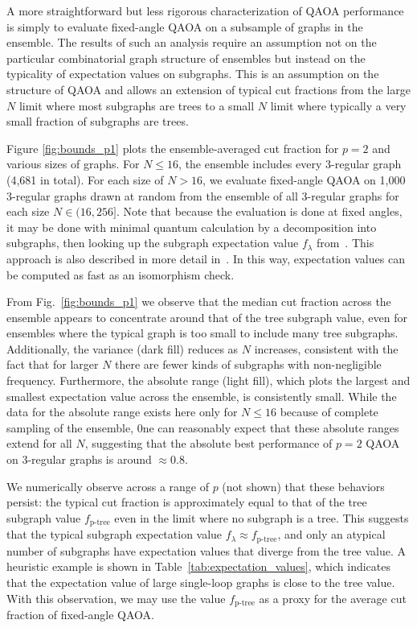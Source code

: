 \documentclass[prb,reprint,nofootinbib,longbibliography,superscriptaddress]{revtex4-1}
\begin{document}
A more straightforward but less rigorous characterization of QAOA performance is simply to evaluate fixed-angle QAOA on a subsample of graphs in the ensemble. The results of such an analysis require an assumption not on the particular combinatorial graph structure of ensembles but instead on the typicality of expectation values on subgraphs. This is an assumption on the structure of QAOA and allows an extension of typical cut fractions from the large $N$ limit where most subgraphs are trees to a small $N$ limit where typically a very small fraction of subgraphs are trees.

Figure \ref{fig:bounds_p1} plots the ensemble-averaged cut fraction for $p=2$ and various sizes of graphs. For $N\leq 16$, the ensemble includes every 3-regular graph (4,681 in total). For each size of $N>16$, we evaluate fixed-angle QAOA on 1,000 3-regular graphs drawn at random from the ensemble of all 3-regular graphs for each size $N\in (16,256]$. Note that because the evaluation is done at fixed angles, it may be done with minimal quantum calculation by a decomposition into subgraphs, then looking up the subgraph expectation value $f_\lambda$ from~\cite{Wurtz_guarantee}. This approach is also described in more detail in~\cite{shaydulin2021}. In this way, expectation values can be computed as fast as an isomorphism check.

From Fig.~\ref{fig:bounds_p1} we observe that the median cut fraction across the ensemble appears to concentrate around that of the tree subgraph value, even for ensembles where the typical graph is too small to include many tree subgraphs. Additionally, the variance (dark fill) reduces as $N$ increases, consistent with the fact that for larger $N$ there are fewer kinds of subgraphs with non-negligible frequency. Furthermore, the absolute range (light fill), which plots the largest and smallest expectation value across the ensemble, is consistently small. While the data for the absolute range  exists  here only for $N\leq 16$ because of complete sampling of the ensemble, 0ne can reasonably  expect that these absolute ranges extend for all $N$, suggesting that the absolute best performance of $p=2$ QAOA on 3-regular graphs is around $\approx 0.8$.

We numerically observe across a range of $p$ (not shown) that these behaviors persist: the typical cut fraction is approximately equal to that of the tree subgraph value $f_\text{p-tree}$ even in the limit where no subgraph is a tree. This suggests that the typical subgraph expectation value $f_\lambda\approx f_\text{p-tree}$, and only an atypical number of subgraphs have expectation values that diverge from the tree value. A heuristic example  is shown in Table~\ref{tab:expectation_values}, which indicates that the expectation value of large single-loop graphs is  close to the tree value. With this observation, we may use the value $f_\text{p-tree}$ as a proxy for the average cut fraction of fixed-angle QAOA.
\end{document}
